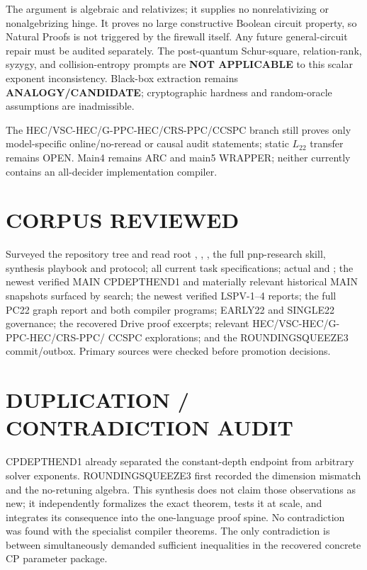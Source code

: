 \documentclass[11pt]{article}
\newcommand{\Ltwo}{L_{22}}
\begin{document}
The argument is algebraic and relativizes; it supplies no nonrelativizing or
nonalgebrizing hinge.  It proves no large constructive Boolean circuit
property, so Natural Proofs is not triggered by the firewall itself.  Any
future general-circuit repair must be audited separately.  The post-quantum
Schur-square, relation-rank, syzygy, and collision-entropy prompts are
\textbf{NOT APPLICABLE} to this scalar exponent inconsistency.  Black-box
extraction remains \textbf{ANALOGY/CANDIDATE}; cryptographic hardness and
random-oracle assumptions are inadmissible.

The HEC/VSC-HEC/G-PPC-HEC/CRS-PPC/CCSPC branch still proves only model-specific
online/no-reread or causal audit statements; static \(\Ltwo\) transfer remains
OPEN.  Main4 remains ARC and main5 WRAPPER; neither currently contains an
all-decider implementation compiler.

\section{CORPUS REVIEWED}
Surveyed the repository tree and read root , ,
, the full pnp-research skill, synthesis playbook and protocol;
all current task specifications; actual  and ;
the newest verified MAIN CPDEPTHEND1 and materially relevant historical MAIN
snapshots surfaced by search; the newest verified LSPV-1--4 reports; the full
PC22 graph report and both compiler programs; EARLY22 and SINGLE22 governance;
the recovered Drive proof excerpts; relevant HEC/VSC-HEC/G-PPC-HEC/CRS-PPC/
CCSPC explorations; and the ROUNDINGSQUEEZE3 commit/outbox.  Primary sources
\cite{derezende,rothvoss,lauria} were checked before promotion decisions.

\section{DUPLICATION / CONTRADICTION AUDIT}
CPDEPTHEND1 already separated the constant-depth endpoint from arbitrary
solver exponents.  ROUNDINGSQUEEZE3 first recorded the dimension mismatch and
the no-retuning algebra.  This synthesis does not claim those observations as
new; it independently formalizes the exact theorem, tests it at scale, and
integrates its consequence into the one-language proof spine.  No
contradiction was found with the specialist compiler theorems.  The only
contradiction is between simultaneously demanded sufficient inequalities in
the recovered concrete CP parameter package.
\end{document}
